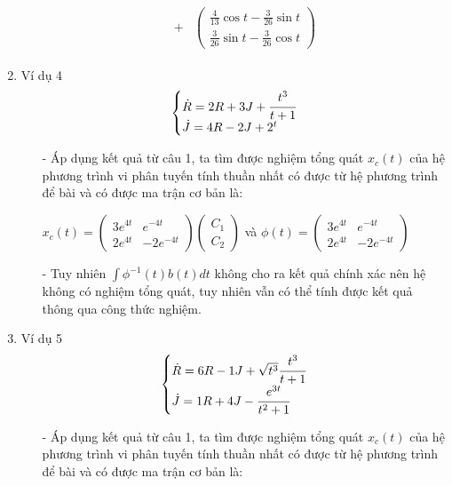\documentclass[a4paper]{article}
\begin{document}
\begin{enumerate}
\begin{itemize}
\begin{align*}
\begin{split}
                +& \left( \begin{matrix} \frac{4}{13}\cos{t}-\frac{3}{26}\sin{t} \\[4pt] \frac{3}{26}\sin{t}-\frac{3}{26}\cos{t} \end{matrix} \right)
             \end{split}
        \end{align*}
    \end{itemize}
\item Ví dụ 4  $$\left\{\begin{array}{@{}l@{}}
            \dot{R} = 2R + 3J + \cfrac{t^3}{t+1} \\
            \dot{J} =  4R - 2J + 2^t
        \end{array}\right.$$
    \begin{itemize}
    \item[-] Áp dụng kết quả từ câu 1, ta tìm được nghiệm tổng quát $x_c(t)$ của hệ phương trình vi phân tuyến tính thuần nhất có được từ hệ phương trình để bài và có được ma trận cơ bản là:
        \begin{center}
            $x_c(t) = \left( \begin{matrix} 3e^{4t} & e^{-4t} \\ 2e^{4t} & -2e^{-4t} \end{matrix} \right) \left( \begin{matrix} C_1 \\ C_2 \end{matrix} \right)$ và $\phi(t) = \left( \begin{matrix} 3e^{4t} & e^{-4t} \\ 2e^{4t} & -2e^{-4t} \end{matrix} \right)$
        \end{center}
    \item[-] Tuy nhiên $\int\phi^{-1}(t)b(t)dt$ không cho ra kết quả chính xác nên hệ không có nghiệm tổng quát, tuy nhiên vẫn có thể tính được kết quả thông qua công thức nghiệm.
    \end{itemize}
\item Ví dụ 5  $$\left\{\begin{array}{@{}l@{}}
            \dot{R} = 6R - 1J + \sqrt{t^3}\cfrac{t^3}{t+1} \\[5pt]
            \dot{J} =  1R + 4J - \cfrac{e^{3t}}{t^2+1}
        \end{array}\right.$$
    \begin{itemize}
    \item[-] Áp dụng kết quả từ câu 1, ta tìm được nghiệm tổng quát $x_c(t)$ của hệ phương trình vi phân tuyến tính thuần nhất có được từ hệ phương trình để bài và có được ma trận cơ bản là:

\end{itemize}
\end{enumerate}
\end{document}
